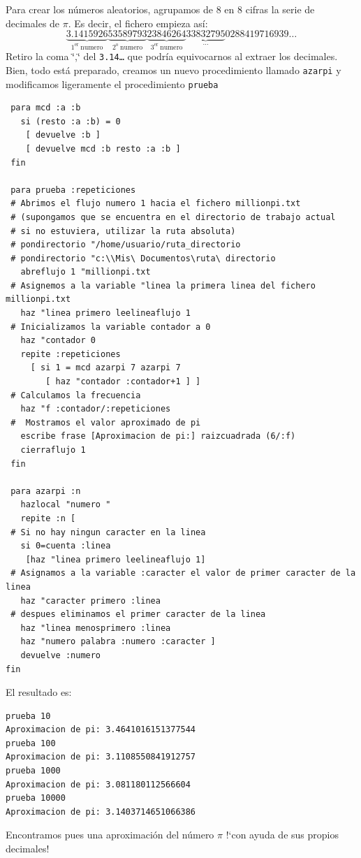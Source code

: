 \documentclass[12pt,twoside,spanish,a4paper]{report}
\begin{document}
Para crear los n\'umeros aleatorios, agrupamos de 8 en 8 cifras la serie
de decimales de $\pi$. Es decir, el fichero empieza as\'i:
\[ \underbrace{3.1415926}_{\mathrm{1^{er}\ numero}}
   \underbrace{53589793}_{\mathrm{2^o\ numero}}
   \underbrace{23846264}_{\mathrm{3^{er}\ numero}}
   \underbrace{33832795}_{\ldots}0288419716939\ldots \]
Retiro la coma \char`\"{},\char`\"{} del \texttt{3.14\ldots} que podr\'ia
equivocarnos al extraer los decimales. Bien, todo est\'a preparado, creamos
un nuevo procedimiento llamado \texttt{azarpi} y modificamos ligeramente el
procedimiento \texttt{prueba}
\begin{verbatim}
 para mcd :a :b
   si (resto :a :b) = 0
    [ devuelve :b ]
    [ devuelve mcd :b resto :a :b ]
 fin

 para prueba :repeticiones
 # Abrimos el flujo numero 1 hacia el fichero millionpi.txt
 # (supongamos que se encuentra en el directorio de trabajo actual
 # si no estuviera, utilizar la ruta absoluta)
 # pondirectorio "/home/usuario/ruta_directorio
 # pondirectorio "c:\\Mis\ Documentos\ruta\ directorio
   abreflujo 1 "millionpi.txt
 # Asignemos a la variable "linea la primera linea del fichero millionpi.txt
   haz "linea primero leelineaflujo 1
 # Inicializamos la variable contador a 0
   haz "contador 0
   repite :repeticiones
     [ si 1 = mcd azarpi 7 azarpi 7
        [ haz "contador :contador+1 ] ]
 # Calculamos la frecuencia
   haz "f :contador/:repeticiones
 #  Mostramos el valor aproximado de pi
   escribe frase [Aproximacion de pi:] raizcuadrada (6/:f)
   cierraflujo 1
 fin

 para azarpi :n
   hazlocal "numero "
   repite :n [
 # Si no hay ningun caracter en la linea
   si 0=cuenta :linea
    [haz "linea primero leelineaflujo 1]
 # Asignamos a la variable :caracter el valor de primer caracter de la linea
   haz "caracter primero :linea
 # despues eliminamos el primer caracter de la linea
   haz "linea menosprimero :linea
   haz "numero palabra :numero :caracter ]
   devuelve :numero
fin \end{verbatim}
\noindent El resultado es:
\begin{verbatim}
prueba 10
Aproximacion de pi: 3.4641016151377544 
prueba 100
Aproximacion de pi: 3.1108550841912757 
prueba 1000
Aproximacion de pi: 3.081180112566604
prueba 10000
Aproximacion de pi: 3.1403714651066386 \end{verbatim}

Encontramos pues una aproximaci\'on del n\'umero $\pi$ !`con ayuda de
sus propios decimales!\\
\end{document}
